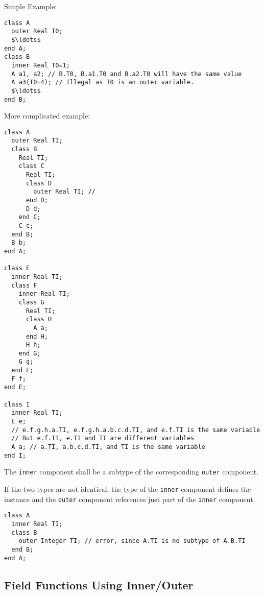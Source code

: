 \begin{example}
Simple Example:
\begin{lstlisting}[language=modelica]
class A
  outer Real T0;
  $\ldots$
end A;
class B
  inner Real T0=1;
  A a1, a2; // B.T0, B.a1.T0 and B.a2.T0 will have the same value
  A a3(T0=4); // Illegal as T0 is an outer variable.
  $\ldots$
end B;
\end{lstlisting}
More complicated example:
\begin{lstlisting}[language=modelica]
class A
  outer Real TI;
  class B
    Real TI;
    class C
      Real TI;
      class D
        outer Real TI; //
      end D;
      D d;
    end C;
    C c;
  end B;
  B b;
end A;

class E
  inner Real TI;
  class F
    inner Real TI;
    class G
      Real TI;
      class H
        A a;
      end H;
      H h;
    end G;
    G g;
  end F;
  F f;
end E;

class I
  inner Real TI;
  E e;
  // e.f.g.h.a.TI, e.f.g.h.a.b.c.d.TI, and e.f.TI is the same variable
  // But e.f.TI, e.TI and TI are different variables
  A a; // a.TI, a.b.c.d.TI, and TI is the same variable
end I;
\end{lstlisting}
\end{example}

The \lstinline!inner! component shall be a subtype of the corresponding \lstinline!outer! component.

\begin{nonnormative}
If the two types are not identical, the type of the \lstinline!inner! component defines the instance and the \lstinline!outer! component references just part of the
\lstinline!inner! component.
\end{nonnormative}

\begin{example}
\begin{lstlisting}[language=modelica]
class A
  inner Real TI;
  class B
    outer Integer TI; // error, since A.TI is no subtype of A.B.TI
  end B;
end A;
\end{lstlisting}
\end{example}


\subsection{Field Functions Using Inner/Outer}\label{example-of-field-functions-using-inner-outer}\label{field-functions-using-inner-outer}

